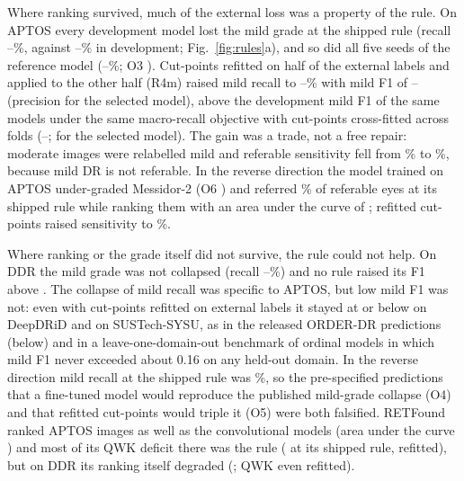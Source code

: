 Where ranking survived, much of the external loss was a property of the rule. On APTOS every
development model lost the mild grade at the shipped rule (recall
--\%, against --\%
in development; Fig.~\ref{fig:rules}a), and so did all five seeds of the reference model
(--\%; O3 ). Cut-points refitted
on half of the external labels and applied to the other half (R4m) raised mild recall to
--\% with mild F1 of
-- (precision 
for the selected model), above the development mild F1 of the same models under the same
macro-recall objective with cut-points cross-fitted across folds
(--;  for the selected
model). The gain was a trade, not a free repair: 
moderate images were relabelled mild and referable sensitivity fell from
\% to \%, because mild DR is not referable.
In the reverse direction the model trained on APTOS under-graded Messidor-2 (O6 ) and
referred \% of referable eyes at its shipped rule while ranking them with an area
under the curve of ; refitted cut-points raised sensitivity to \%.

Where ranking or the grade itself did not survive, the rule could not help. On DDR the mild grade
was not collapsed (recall --\%) and no rule raised its F1
above . The collapse of mild recall was specific to APTOS, but low mild F1
was not: even with cut-points refitted on external labels it stayed at or below
 on DeepDRiD and  on SUSTech-SYSU, as in
the released ORDER-DR predictions (below) and in a leave-one-domain-out benchmark of ordinal models
in which mild F1 never exceeded about 0.16 on any held-out domain\cite{gradeye2026}. In the reverse direction mild
recall at the shipped rule was \%, so the pre-specified predictions that a fine-tuned model would reproduce
the published mild-grade collapse (O4) and that refitted cut-points would triple it (O5) were
both falsified. RETFound ranked APTOS images as well as the convolutional models (area under the
curve ) and most of its QWK deficit there was the rule ( at
its shipped rule,  refitted), but on DDR its ranking itself degraded
(; QWK  even refitted).

